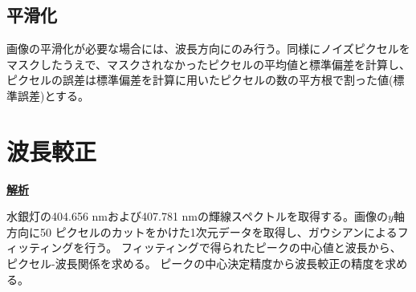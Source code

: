 \documentclass[a4paper,11pt,uplatex]{jsbook}
\begin{document}
\subsection{平滑化}
画像の平滑化が必要な場合には、波長方向にのみ行う。同様にノイズピクセルをマスクしたうえで、マスクされなかったピクセルの平均値と標準偏差を計算し、ピクセルの誤差は標準偏差を計算に用いたピクセルの数の平方根で割った値(標準誤差)とする。

\section{波長較正}
\noindent \textbf{\underline{解析}}\par
水銀灯の404.656 nmおよび407.781 nmの輝線スペクトルを取得する。画像の$y$軸方向に50 ピクセルのカットをかけた1次元データを取得し、ガウシアンによるフィッティングを行う。
フィッティングで得られたピークの中心値と波長から、ピクセル-波長関係を求める。
ピークの中心決定精度から波長較正の精度を求める。
\end{document}
